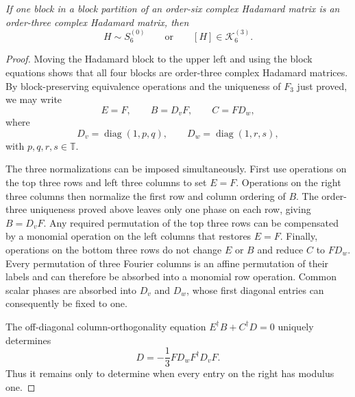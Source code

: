 \documentclass[aps,prx,reprint,nofootinbib,twoside,superscriptaddress,longbibliography,floatfix]{revtex4-2}
\theoremstyle{definition}
\newcommand{\T}{\mathbb T}
\newcommand{\KK}{\mathcal K}
\begin{document}
{\emph{If one block in a block partition of an order-six complex Hadamard matrix is an order-three complex Hadamard matrix, then}}
\begin{equation}
{H\sim S_6^{(0)}
\qquad\text{or}\qquad
[H]\in\KK_6^{(3)}.}
\label{eq:fourierblockalternative}
\end{equation}

\begin{proof}
Moving the Hadamard block to the upper left and using the block equations shows that all four blocks are order-three complex Hadamard matrices.  By block-preserving equivalence operations and the uniqueness of $F_3$ just proved, we may write
\begin{equation}
E=F,\qquad B=D_vF,\qquad C=FD_w,
\label{eq:fouriernormalform}
\end{equation}
where
\begin{equation}
D_v=\operatorname{diag}(1,p,q),\qquad
D_w=\operatorname{diag}(1,r,s),
\label{eq:DvDw}
\end{equation}
with $p,q,r,s\in\T$.

The three normalizations can be imposed simultaneously.  First use operations on the top three rows and left three columns to set $E=F$. Operations on the right three columns then normalize the first row and column ordering of $B$. The order-three uniqueness proved above leaves only one phase on each row, giving $B=D_vF$. Any required permutation of the top three rows can be compensated by a monomial operation on the left columns that restores $E=F$.  Finally, operations on the bottom three rows do not change $E$ or $B$ and reduce $C$ to $FD_w$.  Every permutation of three Fourier columns is an affine permutation of their labels and can therefore be absorbed into a monomial row operation.  Common scalar phases are absorbed into $D_v$ and $D_w$, whose first diagonal entries can consequently be fixed to one.

The off-diagonal column-orthogonality equation $E^{\dagger}B+C^{\dagger}D=0$ uniquely determines
\begin{equation}
D=-\frac{1}{3}FD_wF^{\dagger}D_vF.
\label{eq:Dfourierformula}
\end{equation}
Thus it remains only to determine when every entry on the right has modulus one.


\end{proof}
\end{document}
